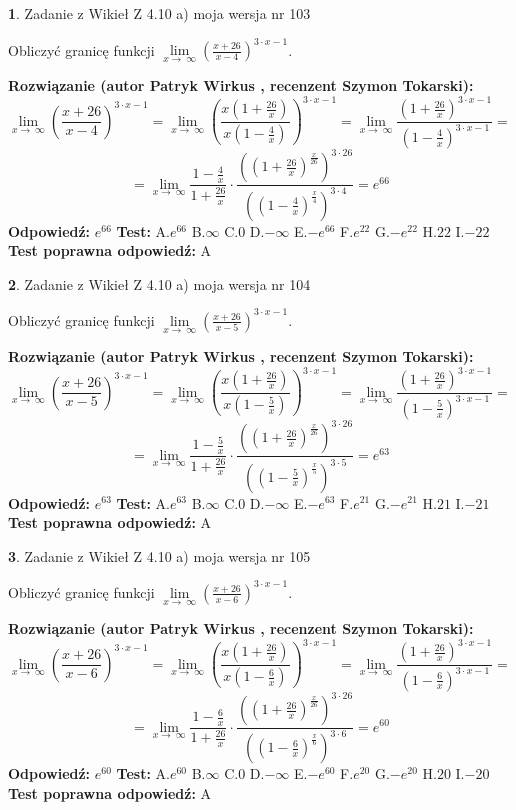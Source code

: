 \documentclass[12pt, a4paper]{article}
\theoremstyle{definition} %
\newtheorem{zad}{}
\newcommand{\zadStart}[1]{\begin{zad}#1\newline}
\newcommand{\zadStop}{\end{zad}}
\newcommand{\rozwStart}[2]{\noindent \textbf{Rozwiązanie (autor #1 , recenzent #2): }\newline}
\newcommand{\rozwStop}{\newline}
\newcommand{\odpStart}{\noindent \textbf{Odpowiedź:}\newline}
\newcommand{\odpStop}{\newline}
\newcommand{\testStart}{\noindent \textbf{Test:}\newline}
\newcommand{\testStop}{\newline}
\newcommand{\kluczStart}{\noindent \textbf{Test poprawna odpowiedź:}\newline}
\newcommand{\kluczStop}{\newline}
\begin{document}
\zadStart{Zadanie z Wikieł Z 4.10 a) moja wersja nr 103}

Obliczyć granicę funkcji  $\lim\limits_{x\to\ \infty}(\frac{x+26}{x-4})^{3\cdot x-1}$.
\zadStop
\rozwStart{Patryk Wirkus}{Szymon Tokarski}
$$\lim\limits_{x\to\ \infty}(\frac{x+26}{x-4})^{3\cdot x-1} = \lim\limits_{x\to\ \infty}(\frac{x(1+\frac{26}{x})}{x(1-\frac{4}{x})})^{3\cdot x-1}=\lim\limits_{x\to\ \infty}\frac{(1+\frac{26}{x})^{3\cdot x-1}}{(1-\frac{4}{x})^{3\cdot x-1}}=$$
$$=\lim\limits_{x\to\ \infty}\frac{1-\frac{4}{x}}{1+\frac{26}{x}}\cdot\frac{((1+\frac{26}{x})^{\frac{x}{26}})^{3\cdot26}}{((1-\frac{4}{x})^{\frac{x}{4}})^{3\cdot4}}=e^{66}$$
\rozwStop
\odpStart
$e^{66}$
\odpStop
\testStart
A.$e^{66}$ B.$\infty$ C.$0$ D.$-\infty$ E.$-e^{66}$
F.$e^{22}$ G.$-e^{22}$
H.$22$
I.$-22$
\testStop
\kluczStart
A
\kluczStop



\zadStart{Zadanie z Wikieł Z 4.10 a) moja wersja nr 104}

Obliczyć granicę funkcji  $\lim\limits_{x\to\ \infty}(\frac{x+26}{x-5})^{3\cdot x-1}$.
\zadStop
\rozwStart{Patryk Wirkus}{Szymon Tokarski}
$$\lim\limits_{x\to\ \infty}(\frac{x+26}{x-5})^{3\cdot x-1} = \lim\limits_{x\to\ \infty}(\frac{x(1+\frac{26}{x})}{x(1-\frac{5}{x})})^{3\cdot x-1}=\lim\limits_{x\to\ \infty}\frac{(1+\frac{26}{x})^{3\cdot x-1}}{(1-\frac{5}{x})^{3\cdot x-1}}=$$
$$=\lim\limits_{x\to\ \infty}\frac{1-\frac{5}{x}}{1+\frac{26}{x}}\cdot\frac{((1+\frac{26}{x})^{\frac{x}{26}})^{3\cdot26}}{((1-\frac{5}{x})^{\frac{x}{5}})^{3\cdot5}}=e^{63}$$
\rozwStop
\odpStart
$e^{63}$
\odpStop
\testStart
A.$e^{63}$ B.$\infty$ C.$0$ D.$-\infty$ E.$-e^{63}$
F.$e^{21}$ G.$-e^{21}$
H.$21$
I.$-21$
\testStop
\kluczStart
A
\kluczStop



\zadStart{Zadanie z Wikieł Z 4.10 a) moja wersja nr 105}

Obliczyć granicę funkcji  $\lim\limits_{x\to\ \infty}(\frac{x+26}{x-6})^{3\cdot x-1}$.
\zadStop
\rozwStart{Patryk Wirkus}{Szymon Tokarski}
$$\lim\limits_{x\to\ \infty}(\frac{x+26}{x-6})^{3\cdot x-1} = \lim\limits_{x\to\ \infty}(\frac{x(1+\frac{26}{x})}{x(1-\frac{6}{x})})^{3\cdot x-1}=\lim\limits_{x\to\ \infty}\frac{(1+\frac{26}{x})^{3\cdot x-1}}{(1-\frac{6}{x})^{3\cdot x-1}}=$$
$$=\lim\limits_{x\to\ \infty}\frac{1-\frac{6}{x}}{1+\frac{26}{x}}\cdot\frac{((1+\frac{26}{x})^{\frac{x}{26}})^{3\cdot26}}{((1-\frac{6}{x})^{\frac{x}{6}})^{3\cdot6}}=e^{60}$$
\rozwStop
\odpStart
$e^{60}$
\odpStop
\testStart
A.$e^{60}$ B.$\infty$ C.$0$ D.$-\infty$ E.$-e^{60}$
F.$e^{20}$ G.$-e^{20}$
H.$20$
I.$-20$
\testStop
\kluczStart
A
\kluczStop
\end{document}
